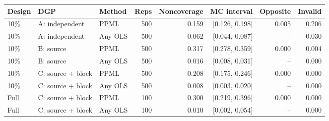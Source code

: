 \begin{tabular}{lllrrrrr}
\toprule
Design & DGP & Method & Reps & Noncoverage & MC interval & Opposite & Invalid \\
\midrule
10\% & A: independent & PPML & 500 & 0.159 & [0.126, 0.198] & 0.005 & 0.206 \\
10\% & A: independent & Any OLS & 500 & 0.062 & [0.044, 0.087] & -- & 0.030 \\
10\% & B: source & PPML & 500 & 0.317 & [0.278, 0.359] & 0.000 & 0.004 \\
10\% & B: source & Any OLS & 500 & 0.016 & [0.008, 0.031] & -- & 0.000 \\
10\% & C: source + block & PPML & 500 & 0.208 & [0.175, 0.246] & 0.000 & 0.000 \\
10\% & C: source + block & Any OLS & 500 & 0.008 & [0.003, 0.020] & -- & 0.000 \\
Full & C: source + block & PPML & 100 & 0.300 & [0.219, 0.396] & 0.000 & 0.000 \\
Full & C: source + block & Any OLS & 100 & 0.010 & [0.002, 0.054] & -- & 0.000 \\
\bottomrule
\end{tabular}
